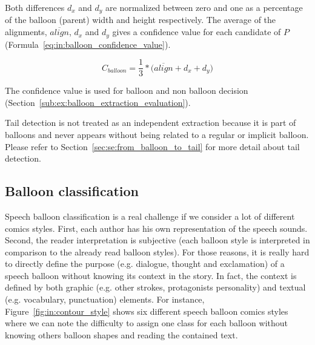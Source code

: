 Both differences $d_x$ and $d_y$ are normalized between zero and one as a percentage of the balloon (parent) width and height respectively.
The average of the alignments, $\overline{align}$, $d_x$ and $d_y$ gives a confidence value for each candidate of $P$ (Formula~\ref{eq:in:balloon_confidence_value}).

\begin{equation}
	\label{eq:in:balloon_confidence_value}
	C_{balloon} = \frac{1}{3} * \Big( \overline{align} + d_x + d_y \Big)
\end{equation}

The confidence value is used for balloon and non balloon decision (Section~\ref{sub:ex:balloon_extraction_evaluation}).


Tail detection is not treated as an independent extraction because it is part of balloons and never appears without being related to a regular or implicit balloon.
Please refer to Section~\ref{sec:se:from_balloon_to_tail} for more detail about tail detection.

\subsection{Balloon classification} %
\label{sub:in:balloon_classification}

Speech balloon classification is a real challenge if we consider a lot of different comics styles.
First, each author has his own representation of the speech sounds. Second, the reader interpretation is subjective (each balloon style is interpreted in comparison to the already read balloon styles).
For those reasons, it is really hard to directly define the purpose (e.g. dialogue, thought and exclamation) of a speech balloon without knowing its context in the story.
In fact, the context is defined by both graphic (e.g. other strokes, protagonists personality) and textual (e.g. vocabulary, punctuation) elements.
For instance, Figure~\ref{fig:in:contour_style} shows six different speech balloon comics styles where we can note the difficulty to assign one class for each balloon without knowing others balloon shapes and reading the contained text.



